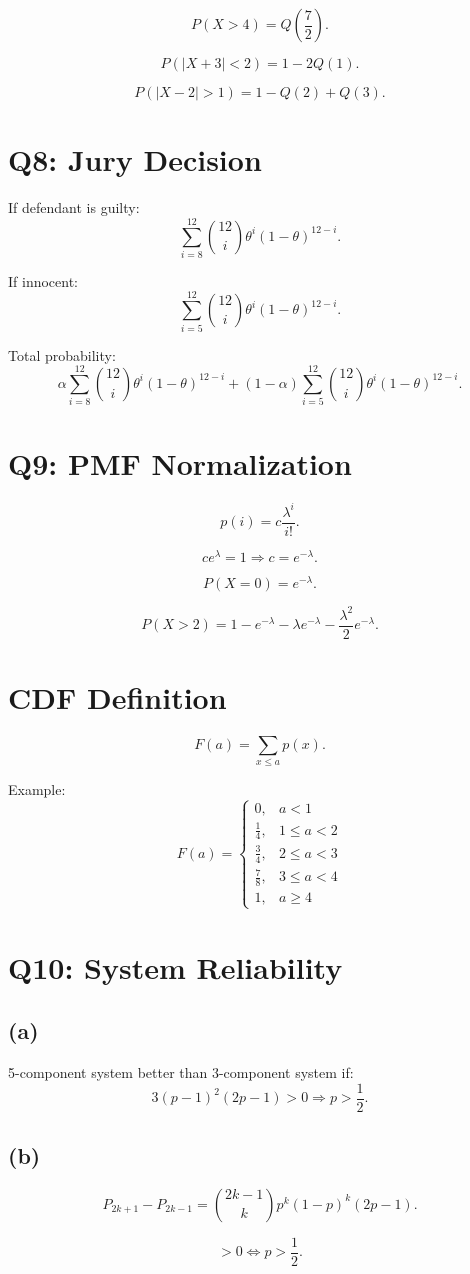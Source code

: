 \documentclass[12pt]{article}
\begin{document}
\[
P(X>4)=Q\left(\frac{7}{2}\right).
\]

\[
P(|X+3|<2)=1-2Q(1).
\]

\[
P(|X-2|>1)=1-Q(2)+Q(3).
\]

\section*{Q8: Jury Decision}

If defendant is guilty:
\[
\sum_{i=8}^{12} \binom{12}{i}\theta^i(1-\theta)^{12-i}.
\]

If innocent:
\[
\sum_{i=5}^{12} \binom{12}{i}\theta^i(1-\theta)^{12-i}.
\]

Total probability:
\[
\alpha \sum_{i=8}^{12} \binom{12}{i}\theta^i(1-\theta)^{12-i}
+
(1-\alpha)\sum_{i=5}^{12} \binom{12}{i}\theta^i(1-\theta)^{12-i}.
\]

\section*{Q9: PMF Normalization}

\[
p(i)=c\frac{\lambda^i}{i!}.
\]

\[
ce^\lambda=1 \Rightarrow c=e^{-\lambda}.
\]

\[
P(X=0)=e^{-\lambda}.
\]

\[
P(X>2)=1-e^{-\lambda}-\lambda e^{-\lambda}-\frac{\lambda^2}{2}e^{-\lambda}.
\]

\section*{CDF Definition}

\[
F(a)=\sum_{x\le a} p(x).
\]

Example:
\[
F(a)=
\begin{cases}
0, & a<1 \\
\frac14, & 1\le a<2 \\
\frac34, & 2\le a<3 \\
\frac78, & 3\le a<4 \\
1, & a\ge4
\end{cases}
\]

\section*{Q10: System Reliability}

\subsection*{(a)}
5-component system better than 3-component system if:
\[
3(p-1)^2(2p-1)>0
\Rightarrow p>\frac12.
\]

\subsection*{(b)}
\[
P_{2k+1}-P_{2k-1}
=
\binom{2k-1}{k} p^k(1-p)^k(2p-1).
\]

\[
>0 \iff p>\frac12.
\]
\end{document}
